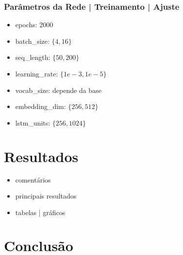 \documentclass{automatextcc}
\begin{document}
\subsection{Parâmetros da Rede | Treinamento | Ajuste}

\begin{itemize}
    \item epochs: 2000
    \item batch\_size: $\{4,16\}$
    \item seq\_length: $\{50,200\}$
    \item learning\_rate: $\{1e-3,1e-5\}$
    \item vocab\_size: depende da base
    \item embedding\_dim: $\{256,512\}$
    \item lstm\_units: $\{256,1024\}$
\end{itemize}

\chapter{Resultados}

\begin{itemize}
    \item comentários
    \item principais resultados
    \item tabelas | gráficos
\end{itemize}

\chapter{Conclusão}





\end{document}
